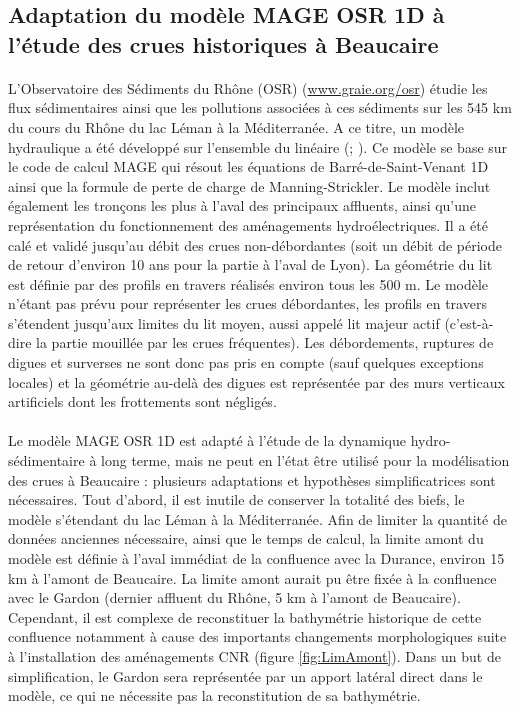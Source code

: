 \documentclass[11pt]{article}
\begin{document}
	\FloatBarrier
	 \subsection{Adaptation du modèle MAGE OSR 1D à l'étude des crues historiques à Beaucaire}
	 
	 \paragraph{} L'Observatoire des Sédiments du Rhône (OSR) (\url{www.graie.org/osr}) étudie les flux sédimentaires ainsi que les pollutions associées à ces sédiments sur les 545 km du cours du Rhône du lac Léman à la Méditerranée. A ce titre, un modèle hydraulique a été développé sur l'ensemble du linéaire (\cite{dugue_accounting_2015}; \cite{launay_numerical_2019}). Ce modèle se base sur le code de calcul MAGE \citep{souhar_approach_2009} qui résout les équations de Barré-de-Saint-Venant 1D ainsi que la formule de perte de charge de Manning-Strickler. Le modèle inclut également les tronçons les plus à l'aval des principaux affluents, ainsi qu'une représentation du fonctionnement des aménagements hydroélectriques. Il a été calé et validé jusqu'au débit des crues non-débordantes (soit un débit de période de retour d'environ 10 ans pour la partie à l'aval de Lyon). La géométrie du lit est définie par des profils en travers réalisés environ tous les 500 m. Le modèle n'étant pas prévu pour représenter les crues débordantes, les profils en travers s'étendent jusqu'aux limites du lit moyen, aussi appelé lit majeur actif (c'est-à-dire la partie mouillée par les crues fréquentes). Les débordements, ruptures de digues et surverses ne sont donc pas pris en compte (sauf quelques exceptions locales) et la géométrie au-delà des digues est représentée par des murs verticaux artificiels dont les frottements sont négligés. 
	 
	 \paragraph{} Le modèle MAGE OSR 1D est adapté à l'étude de la dynamique hydro-sédimentaire à long terme, mais ne peut en l'état être utilisé pour la modélisation des crues à Beaucaire : plusieurs adaptations et hypothèses simplificatrices sont nécessaires. Tout d'abord, il est inutile de conserver la totalité des biefs, le modèle s'étendant du lac Léman à la Méditerranée. Afin de limiter la quantité de données anciennes nécessaire, ainsi que le temps de calcul, la limite amont du modèle est définie à l'aval immédiat de la confluence avec la Durance, environ 15 km à l'amont de Beaucaire. La limite amont aurait pu être fixée à la confluence avec le Gardon (dernier affluent du Rhône, 5 km à l'amont de Beaucaire). Cependant, il est complexe de reconstituer la bathymétrie historique de cette confluence notamment à cause des importants changements morphologiques suite à l'installation des aménagements CNR (figure \ref{fig:LimAmont}). Dans un but de simplification, le Gardon sera représentée par un apport latéral direct dans le modèle, ce qui ne nécessite pas la reconstitution de sa bathymétrie. 
	 
\end{document}
